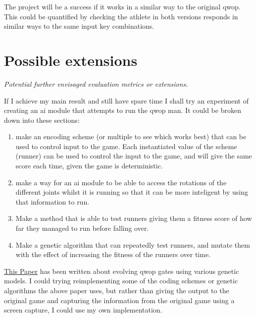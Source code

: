 \documentclass[12pt,a4paper,twoside]{article}
\begin{document}
The project will be a success if it works in a similar way to the original qwop. This could be quantified by checking the athlete in both versions responds in similar ways to the same input key combinations.


\section*{Possible extensions}

{\em Potential further envisaged evaluation metrics or extensions.}

If I achieve my main result and still have spare time I shall try an experiment of creating an ai module that attempts to run the qwop man. It could be broken down into these sections:

\begin{enumerate}
\item make an encoding scheme (or multiple to see which works best) that can be used to control input to the game. Each instantiated value of the scheme (runner) can be used to control the input to the game, and will give the same score each time, given the game is deterministic.

\item  make a way for an ai module to be able to access the rotations of the different joints whilst it is running so that it can be more inteligent by using that information to run.

\item Make a method that is able to test runners giving them a fitness score of how far they managed to run before falling over.
  
\item Make a genetic algorithm that can repeatedly test runners, and mutate them with the effect of increasing the fitness of the runners over time.
\end{enumerate}

 
\href{https://dl.acm.org/citation.cfm?id=2598248}{This Paper} has been written about evolving qwop gates using various genetic models.
I could trying reimplementing some of the coding schemes or genetic algorithms the above paper uses, but rather than giving the output to the original game and capturing the information from the original game using a screen capture, I could use my own implementation.
\end{document}
